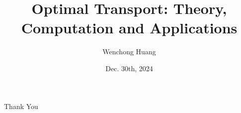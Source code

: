 \documentclass[10pt]{beamer}
\author{Wenchong Huang}
\title{Optimal Transport: Theory, Computation and Applications}
\institute{
    School of Mathematical Sciences, \\
    Zhejiang University.
}
\date{Dec. 30th, 2024}
\begin{document}
\begin{frame}
    \titlepage
\end{frame}





\begin{frame}
    \begin{center}
        {\Huge\calligra Thank You}
    \end{center}
\end{frame}
\end{document}

